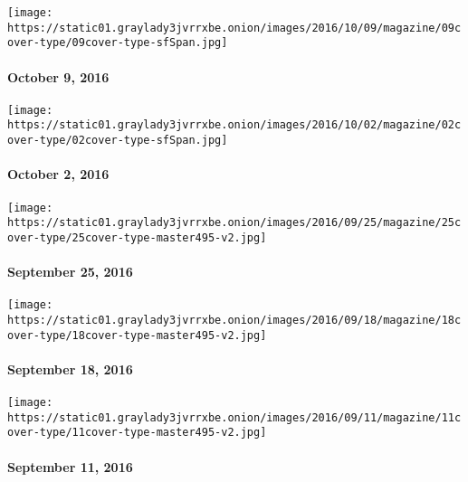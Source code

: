 \href{http://www.nytimes3xbfgragh.onion/indexes/2016/10/09/magazine/index.html}{}

\texttt{[image: https://static01.graylady3jvrrxbe.onion/images/2016/10/09/magazine/09cover-type/09cover-type-sfSpan.jpg]}

\hypertarget{october-9-2016}{%
\paragraph{October 9, 2016}\label{october-9-2016}}

\href{http://www.nytimes3xbfgragh.onion/indexes/2016/10/02/magazine/index.html}{}

\texttt{[image: https://static01.graylady3jvrrxbe.onion/images/2016/10/02/magazine/02cover-type/02cover-type-sfSpan.jpg]}

\hypertarget{october-2-2016}{%
\paragraph{October 2, 2016}\label{october-2-2016}}

\href{http://www.nytimes3xbfgragh.onion/indexes/2016/09/25/magazine/index.html}{}

\texttt{[image: https://static01.graylady3jvrrxbe.onion/images/2016/09/25/magazine/25cover-type/25cover-type-master495-v2.jpg]}

\hypertarget{september-25-2016}{%
\paragraph{September 25, 2016}\label{september-25-2016}}

\href{http://www.nytimes3xbfgragh.onion/indexes/2016/09/18/magazine/index.html}{}

\texttt{[image: https://static01.graylady3jvrrxbe.onion/images/2016/09/18/magazine/18cover-type/18cover-type-master495-v2.jpg]}

\hypertarget{september-18-2016}{%
\paragraph{September 18, 2016}\label{september-18-2016}}

\href{http://www.nytimes3xbfgragh.onion/indexes/2016/09/11/magazine/index.html}{}

\texttt{[image: https://static01.graylady3jvrrxbe.onion/images/2016/09/11/magazine/11cover-type/11cover-type-master495-v2.jpg]}

\hypertarget{september-11-2016}{%
\paragraph{September 11, 2016}\label{september-11-2016}}

